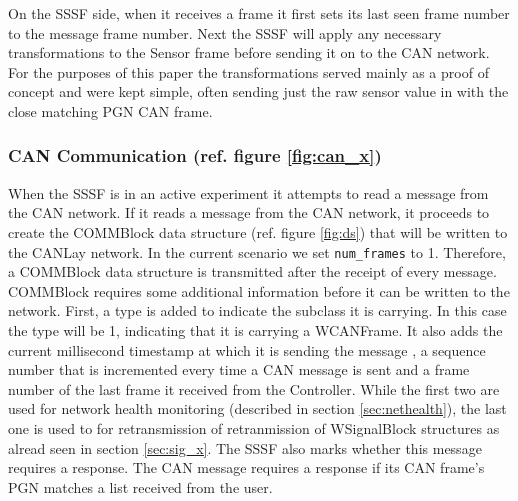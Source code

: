 \documentclass[letterpaper,twocolumn,10pt]{article}
\begin{document}
On the SSSF side, when it receives a frame it first sets its last seen frame number to the message frame number. Next the SSSF will apply any necessary transformations to the Sensor frame before sending it on to the CAN network. For the purposes of this paper the transformations served mainly as a proof of concept and were kept simple, often sending just the raw sensor value in with the close matching PGN CAN frame.

\subsubsection{CAN Communication (ref. figure \ref{fig:can_x})}

When the SSSF is in an active experiment it 
attempts to read a message from the CAN network. If it reads a message from the CAN network, it proceeds to create the COMMBlock data structure (ref. figure \ref{fig:ds}) that will be written to the CANLay network. In the current scenario we set \texttt{num\_frames} to 1. Therefore, a COMMBlock data structure is transmitted after the receipt of every message.
COMMBlock requires some additional information before it can be written to the network. 
First, a type is added to indicate the subclass it is carrying. In this case the type will be 1, indicating that it is carrying a WCANFrame. 
It also adds the current millisecond timestamp at which it is sending the message
, a sequence number that is incremented every time a CAN message is sent
and a frame number of the last frame it received from the Controller.
While the first two are used for network health monitoring (described in section \ref{sec:nethealth}), the last one is used to for retransmission of retranmission of WSignalBlock structures as alread seen in section \ref{sec:sig_x}.
The SSSF also marks whether this message requires a response. The CAN message requires a response if its CAN frame’s PGN matches a list received from the user.
\end{document}
